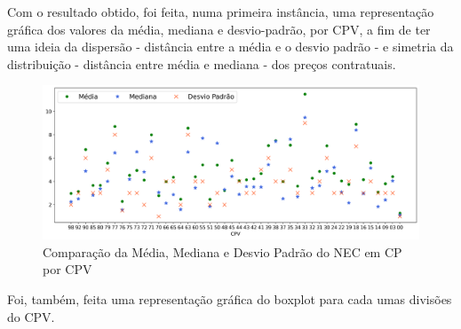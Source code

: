 Com o resultado obtido, foi feita, numa primeira instância, uma representação gráfica dos valores da média, mediana e desvio-padrão, por CPV, a fim de ter uma ideia da dispersão - distância entre a média e o desvio padrão - e simetria da distribuição - distância entre média e mediana - dos preços contratuais.

\begin{figure}[!htbp]
	\centering
	\includegraphics[width=\textwidth]{imagens/mmdp.png}
	\caption{Comparação da Média, Mediana e Desvio Padrão do NEC em CP por CPV}
	\label{}
\end{figure}

Foi, também, feita uma representação gráfica do boxplot para cada umas divisões do CPV. 

%
%

